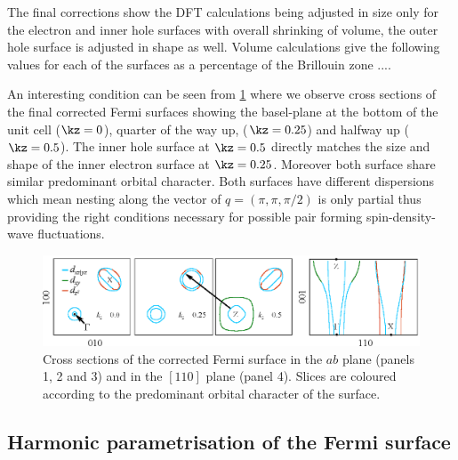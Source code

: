 The final corrections show the DFT calculations being adjusted in size only for the electron and inner hole surfaces with overall shrinking of volume, the outer hole surface is adjusted in shape as well. Volume calculations give the following values for each of the surfaces as a percentage of the Brillouin zone ....




An interesting condition can be seen from \fig\ref{Fig:ResD:ZSlices} where we observe cross sections of the final corrected Fermi surfaces showing the basel-plane at the bottom of the unit cell ($\kz=0$), quarter of the way up, ($\kz=0.25$) and halfway up ($\kz=0.5$). The inner hole surface at $\kz=0.5$ directly matches the size and shape of the inner electron surface at $\kz=0.25$. Moreover both surface share similar predominant \DxzDyz orbital character. Both surfaces have different \kz dispersions which mean nesting along the vector of $q=(\pi, \pi, \pi/2)$ is only partial thus providing the right conditions necessary for possible pair forming spin-density-wave fluctuations.


\begin{figure}[htbp]
    \begin{center}
        \includegraphics[scale=0.9]{Chapter-dHvABaFe2P2/Figures/AngleDepMeasurements/ZSlices/ZSlices}
        \caption{Cross sections of the corrected Fermi surface in the $ab$ plane (panels 1, 2 and 3) and in the $[110]$ plane (panel 4). Slices are coloured according to the predominant orbital character of the surface.}
        \label{Fig:ResD:ZSlices}
    \end{center}
\end{figure}

\clearpage

\subsection{Harmonic parametrisation of the Fermi surface}
    \label{Sec:ResD:TightBindingFits}

